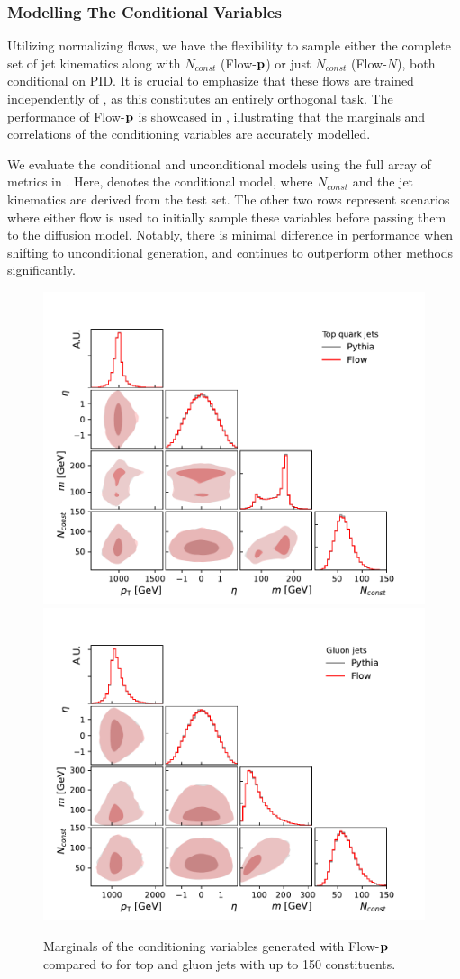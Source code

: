 \subsubsection{Modelling The Conditional Variables}

Utilizing normalizing flows, we have the flexibility to sample either the complete set of jet kinematics along with $N_{const}$ (Flow-$\mathbf{p}$) or just $N_{const}$ (Flow-$N$), both conditional on PID.
It is crucial to emphasize that these flows are trained independently of \pcdroid, as this constitutes an entirely orthogonal task.
The performance of Flow-$\mathbf{p}$ is showcased in , illustrating that the marginals and correlations of the conditioning variables are accurately modelled.

We evaluate the conditional and unconditional models using the full array of metrics in .
Here, \pcdroid denotes the conditional model, where $N_{const}$ and the jet kinematics are derived from the test set.
The other two rows represent scenarios where either flow is used to initially sample these variables before passing them to the diffusion model.
Notably, there is minimal difference in performance when shifting to unconditional generation, and \pcjedi continues to outperform other methods significantly.

\begin{figure}[b!]
    \centering
    \includegraphics[width=0.49\linewidth]{Figures/jet_generation/droid/150/flow_quality_t.pdf}
    \includegraphics[width=0.49\linewidth]{Figures/jet_generation/droid/150/flow_quality_g.pdf}
    \caption{Marginals of the conditioning variables generated with Flow-$\mathbf{p}$ compared to \pythia for top and gluon jets with up to 150 constituents.
    }
    \label{fig:unconditional-flows}
\end{figure}

